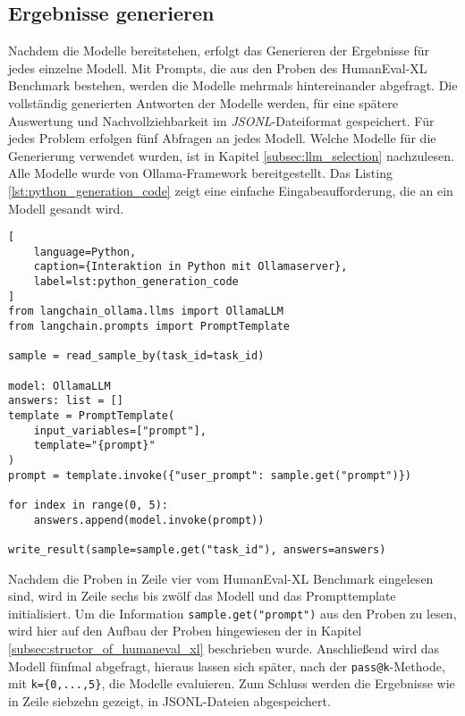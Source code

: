 \subsection{Ergebnisse generieren}
Nachdem die Modelle bereitstehen, erfolgt das Generieren der Ergebnisse für jedes einzelne Modell. Mit Prompts, die aus den Proben des HumanEval-XL Benchmark bestehen, werden die Modelle mehrmals hintereinander abgefragt. Die vollständig generierten Antworten der Modelle werden, für eine spätere Auswertung und Nachvollziehbarkeit im \textit{JSONL}-Dateiformat gespeichert. Für jedes Problem erfolgen fünf Abfragen an jedes Modell. Welche Modelle für die Generierung verwendet wurden, ist in Kapitel \ref{subsec:llm_selection} nachzulesen. Alle Modelle wurde von Ollama-Framework bereitgestellt. Das Listing \ref{lst:python_generation_code} zeigt eine einfache Eingabeaufforderung, die an ein Modell gesandt wird.\vspace{0.2cm}

\begin{lstlisting}[
	language=Python,
	caption={Interaktion in Python mit Ollamaserver},
	label=lst:python_generation_code
]
from langchain_ollama.llms import OllamaLLM
from langchain.prompts import PromptTemplate

sample = read_sample_by(task_id=task_id)

model: OllamaLLM
answers: list = []
template = PromptTemplate(
    input_variables=["prompt"],
    template="{prompt}"
)
prompt = template.invoke({"user_prompt": sample.get("prompt")})

for index in range(0, 5):
    answers.append(model.invoke(prompt))

write_result(sample=sample.get("task_id"), answers=answers)
\end{lstlisting}

Nachdem die Proben in Zeile vier vom HumanEval-XL Benchmark eingelesen sind, wird in Zeile sechs bis zwölf das Modell und das Prompttemplate initialisiert. Um die Information \texttt{sample.get("prompt")} aus den Proben zu lesen, wird hier auf den Aufbau der Proben hingewiesen der in Kapitel \ref{subsec:structor_of_humaneval_xl} beschrieben wurde. Anschließend wird das Modell fünfmal abgefragt, hieraus lassen sich später, nach der \texttt{pass@k}-Methode, mit \texttt{k=\{0,...,5\}}, die Modelle evaluieren. Zum Schluss werden die Ergebnisse wie in Zeile siebzehn gezeigt, in JSONL-Dateien abgespeichert.



